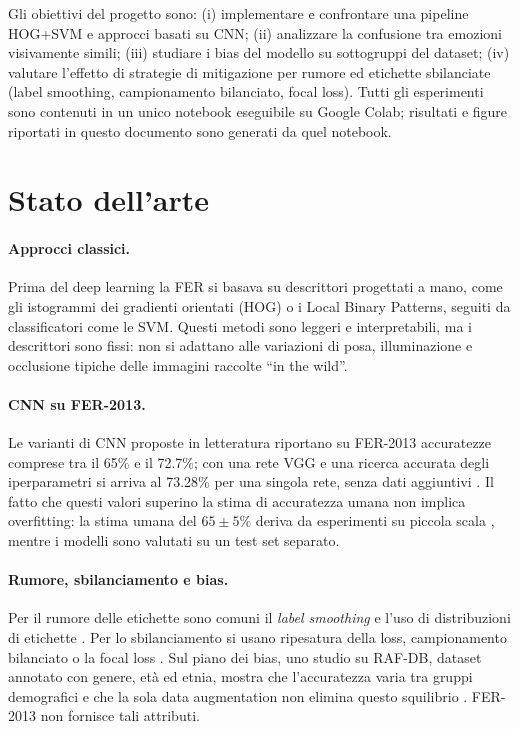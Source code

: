 \documentclass[11pt,a4paper]{article}
\begin{document}
Gli obiettivi del progetto sono: (i) implementare e confrontare una pipeline HOG+SVM e approcci basati su CNN; (ii) analizzare la confusione tra emozioni visivamente simili; (iii) studiare i bias del modello su sottogruppi del dataset; (iv) valutare l'effetto di strategie di mitigazione per rumore ed etichette sbilanciate (label smoothing, campionamento bilanciato, focal loss). Tutti gli esperimenti sono contenuti in un unico notebook eseguibile su Google Colab; risultati e figure riportati in questo documento sono generati da quel notebook.

\section{Stato dell'arte}
\paragraph{Approcci classici.} Prima del deep learning la FER si basava su descrittori progettati a mano, come gli istogrammi dei gradienti orientati (HOG) \cite{dalal2005hog} o i Local Binary Patterns, seguiti da classificatori come le SVM. Questi metodi sono leggeri e interpretabili, ma i descrittori sono fissi: non si adattano alle variazioni di posa, illuminazione e occlusione tipiche delle immagini raccolte ``in the wild''.

\paragraph{CNN su FER-2013.} Le varianti di CNN proposte in letteratura riportano su FER-2013 accuratezze comprese tra il 65\% e il 72.7\%; con una rete VGG e una ricerca accurata degli iperparametri si arriva al 73.28\% per una singola rete, senza dati aggiuntivi \cite{khaireddin2021fer}. Il fatto che questi valori superino la stima di accuratezza umana non implica overfitting: la stima umana del $65\pm5\%$ deriva da esperimenti su piccola scala \cite{goodfellow2015challenges}, mentre i modelli sono valutati su un test set separato.

\paragraph{Rumore, sbilanciamento e bias.} Per il rumore delle etichette sono comuni il \textit{label smoothing} \cite{szegedy2016rethinking} e l'uso di distribuzioni di etichette \cite{barsoum2016ferplus}. Per lo sbilanciamento si usano ripesatura della loss, campionamento bilanciato \cite{mahajan2018weakly} o la focal loss \cite{lin2017focal}. Sul piano dei bias, uno studio su RAF-DB, dataset annotato con genere, età ed etnia, mostra che l'accuratezza varia tra gruppi demografici e che la sola data augmentation non elimina questo squilibrio \cite{xu2020bias}. FER-2013 non fornisce tali attributi.
\end{document}
